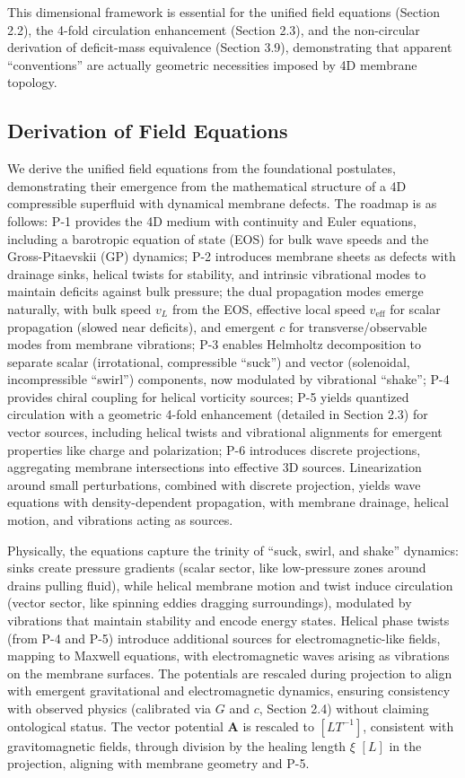 This dimensional framework is essential for the unified field equations (Section 2.2), the 4-fold circulation enhancement (Section 2.3), and the non-circular derivation of deficit-mass equivalence (Section 3.9), demonstrating that apparent ``conventions'' are actually geometric necessities imposed by 4D membrane topology.

\subsection{Derivation of Field Equations}

We derive the unified field equations from the foundational postulates, demonstrating their emergence from the mathematical structure of a 4D compressible superfluid with dynamical membrane defects. The roadmap is as follows: P-1 provides the 4D medium with continuity and Euler equations, including a barotropic equation of state (EOS) for bulk wave speeds and the Gross-Pitaevskii (GP) dynamics; P-2 introduces membrane sheets as defects with drainage sinks, helical twists for stability, and intrinsic vibrational modes to maintain deficits against bulk pressure; the dual propagation modes emerge naturally, with bulk speed $v_L$ from the EOS, effective local speed $v_{\text{eff}}$ for scalar propagation (slowed near deficits), and emergent $c$ for transverse/observable modes from membrane vibrations; P-3 enables Helmholtz decomposition to separate scalar (irrotational, compressible ``suck'') and vector (solenoidal, incompressible ``swirl'') components, now modulated by vibrational ``shake''; P-4 provides chiral coupling for helical vorticity sources; P-5 yields quantized circulation with a geometric 4-fold enhancement (detailed in Section 2.3) for vector sources, including helical twists and vibrational alignments for emergent properties like charge and polarization; P-6 introduces discrete projections, aggregating membrane intersections into effective 3D sources. Linearization around small perturbations, combined with discrete projection, yields wave equations with density-dependent propagation, with membrane drainage, helical motion, and vibrations acting as sources.

Physically, the equations capture the trinity of ``suck, swirl, and shake'' dynamics: sinks create pressure gradients (scalar sector, like low-pressure zones around drains pulling fluid), while helical membrane motion and twist induce circulation (vector sector, like spinning eddies dragging surroundings), modulated by vibrations that maintain stability and encode energy states. Helical phase twists (from P-4 and P-5) introduce additional sources for electromagnetic-like fields, mapping to Maxwell equations, with electromagnetic waves arising as vibrations on the membrane surfaces. The potentials are rescaled during projection to align with emergent gravitational and electromagnetic dynamics, ensuring consistency with observed physics (calibrated via $G$ and $c$, Section 2.4) without claiming ontological status. The vector potential $\mathbf{A}$ is rescaled to $[L T^{-1}]$, consistent with gravitomagnetic fields, through division by the healing length $\xi$ $[L]$ in the projection, aligning with membrane geometry and P-5.

